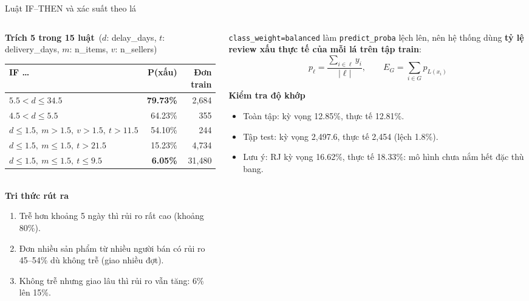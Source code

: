 \documentclass[aspectratio=169,10pt,xcolor=table]{beamer}
\begin{document}
\begin{frame}{Luật IF--THEN và xác suất theo lá}
  \begin{columns}[T]
    \begin{column}{0.54\textwidth}
      \footnotesize
      \textbf{Trích 5 trong 15 luật} \,{\scriptsize($d$: delay\_days, $t$: delivery\_days, $m$: n\_items, $v$: n\_sellers)}\\[0.1cm]
      \begin{tabular}{@{}P{4.9cm}rr@{}}
        \toprule
        IF \dots & P(xấu) & Đơn train\\
        \midrule
        $5.5 < d \le 34.5$ & \textcolor{bad}{\textbf{79.73\%}} & 2,684\\
        $4.5 < d \le 5.5$ & 64.23\% & 355\\
        $d \le 1.5,\ m > 1.5,\ v > 1.5,\ t > 11.5$ & 54.10\% & 244\\
        $d \le 1.5,\ m \le 1.5,\ t > 21.5$ & 15.23\% & 4,734\\
        $d \le 1.5,\ m \le 1.5,\ t \le 9.5$ & \textcolor{good}{\textbf{6.05\%}} & 31,480\\
        \bottomrule
      \end{tabular}\\[0.15cm]
      \textbf{Tri thức rút ra}
      \begin{enumerate}
        \item Trễ hơn khoảng 5 ngày thì rủi ro rất cao (khoảng 80\%).
        \item Đơn nhiều sản phẩm từ nhiều người bán có rủi ro 45--54\% dù không trễ (giao nhiều đợt).
        \item Không trễ nhưng giao lâu thì rủi ro vẫn tăng: 6\% lên 15\%.
      \end{enumerate}
    \end{column}
    \begin{column}{0.43\textwidth}
      \begin{keybox}[title={Xác suất theo lá (leaf rate)},coltitle=white,colbacktitle=bkblue,fonttitle=\small\bfseries]
        \texttt{class\_weight=balanced} làm \texttt{predict\_proba} lệch lên, nên hệ thống dùng \textbf{tỷ lệ review xấu thực tế của mỗi lá trên tập train}:
        \[ p_\ell = \frac{\sum_{i\in\ell} y_i}{|\ell|},\qquad E_G = \sum_{i\in G} p_{L(x_i)} \]
      \end{keybox}
      \footnotesize
      \textbf{Kiểm tra độ khớp}
      \begin{itemize}
        \item Toàn tập: kỳ vọng 12.85\%, thực tế 12.81\%.
        \item Tập test: kỳ vọng 2,497.6, thực tế 2,454 (lệch 1.8\%).
        \item \textcolor{accent}{Lưu ý}: RJ kỳ vọng 16.62\%, thực tế 18.33\%: mô hình chưa nắm hết đặc thù bang.
      \end{itemize}
    \end{column}
  \end{columns}
\end{frame}
\end{document}
